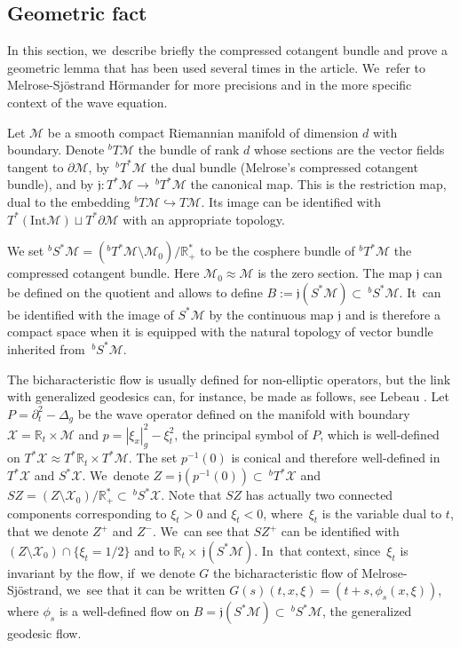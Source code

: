 \documentclass[JEP,XML,SOM,Unicode,published]{cedram}
\theoremstyle{definition}
\let\mc\mathcal
\newcommand{\M}{\mc{M}}
\newcommand{\X}{\mc{X}}
\newcommand{\R}{\mathbb{R}}
\begin{document}
\subsection{Geometric fact}\label{s:geom}
In this section, we~describe briefly the compressed cotangent bundle and prove a geometric lemma that has been used several times in the article. We~refer to Melrose-Sjöstrand \cite{MS:78} Hörmander \cite[\S 18.3 \& 24.3]{H:07} for more precisions and \cite[\S 2.2]{BL:01} in the more specific context of the wave equation.

Let $\M$ be a smooth compact Riemannian manifold of dimension $d$ with boundary. Denote $^bT\M$ the bundle of rank $d$ whose sections are the vector fields tangent to $\partial \M$, by~$^bT^*\M$ the dual bundle (Melrose's compressed cotangent bundle), and by $\mathfrak{j}:T^*\M\rightarrow~ ^bT^*\M$ the canonical map. This is the restriction map, dual to the embedding $^bT\M\hookrightarrow T\M$. Its image can be identified with $T^* (\text{Int}\M) \sqcup T^* \partial\M$ with an appropriate topology.

We set $^bS^*\M=(^bT^*\M\setminus \M_0)/\R_+^*$ to be the cosphere bundle of $^bT^*\M$ the compressed cotangent bundle. Here $\M_0\approx \M$ is the zero section. The map $\mathfrak{j}$ can be defined on the quotient and allows to define $B:=\mathfrak{j}(S^*\M)\subset ~^bS^*\M$. It~can be identified with the image of $S^*\M$ by the continuous map $\mathfrak{j}$ and is therefore a compact space when it is equipped with the natural topology of vector bundle inherited from $~^bS^*\M$.

The bicharacteristic flow is usually defined for non-elliptic operators, but the link with generalized geodesics can, for instance, be made as follows, see Lebeau \cite[\S A.3]{L:96}. Let $P=\partial_t^2-\Delta_g$ be the wave operator defined on the manifold with boundary $\X=\R_t\times \M$ and $p=|\xi_x|_g^2-\xi_t^2$, the principal symbol of $P$, which is well-defined on $T^*\X\approx T^*\R_t\times T^*\M$. The set $p^{-1}(0)$ is conical and therefore well-defined in $T^*\X$ and $S^*\X$. We~denote $Z=\mathfrak{j}(p^{-1}(0))\subset~ ^bT^*\X$ and $SZ=(Z\setminus \X_0)/\R_+^*\subset ~ ^bS^*\X$. Note that $SZ$ has actually two connected components corresponding to $\xi_t>0$ and $\xi_t<0$, where~$\xi_t$ is the variable dual to $t$, that we denote $Z^+$ and $Z^-$. We~can see that $SZ^+$ can be identified with $(Z\setminus \X_0)\cap \{\xi_t=1/2\}$ and to $\R_t\times~ \mathfrak{j}(S^*\M)$. In~that context, since~$\xi_t$ is invariant by the flow, if~we denote $G$ the bicharacteristic flow of Melrose-Sjöstrand, we~see that it can be written $
G(s)(t,x,\xi)=(t+s,\phi_s (x,\xi))$, where $\phi_s$ is a well-defined flow on $B=\mathfrak{j}(S^*\M)\subset ~^bS^*\M$, the generalized geodesic flow.
\end{document}
